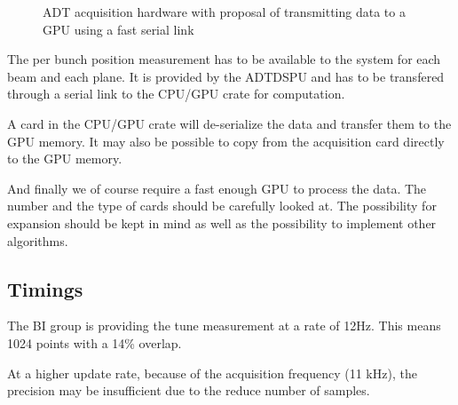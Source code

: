 \begin{figure}[H]
\caption{ADT acquisition hardware with proposal of transmitting data to a GPU using a fast serial link}
\centering
\end{figure}

The per bunch position measurement has to be available to the system for each beam and each plane. It is provided by the \gls{ADTDSPU} and has to be transfered through a serial link to the CPU/GPU crate for computation.

A card in the CPU/GPU crate will de-serialize the data and transfer them to the GPU memory. It may also be possible to copy from the acquisition card directly to the GPU memory.

And finally we of course require a fast enough GPU to process the data. The number and the type of cards should be carefully looked at. The possibility for expansion should be kept in mind as well as the possibility to implement other algorithms.

\subsection{Timings}

The \gls{BI} group is providing the tune measurement at a rate of 12Hz. This means 1024 points with a 14\% overlap. 

At a higher update rate, because of the acquisition frequency (11 kHz), the precision may be insufficient due to the reduce number of samples.
